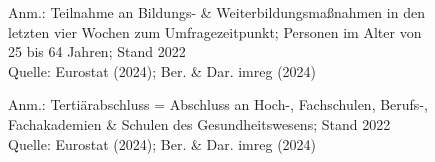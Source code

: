 \begin{figure}[p]
	{\centering {}}
	\label{map:weiterbildung}
	\begin{spacing}{1} \scriptsize
		Anm.: Teilnahme an Bildungs- \& Weiterbildungsmaßnahmen in den letzten vier Wochen zum Umfragezeitpunkt; Personen im Alter von 25 bis 64 Jahren; Stand 2022\\
		Quelle: Eurostat (2024); Ber. \& Dar. imreg (2024) \end{spacing}
\end{figure}


\begin{figure}[p]
	{\centering {}}
	\label{map:tertbildung}
	\begin{spacing}{1} \scriptsize
		Anm.: Tertiärabschluss = Abschluss an Hoch-, Fachschulen, Berufs-, Fachakademien \& Schulen des Gesundheitswesens; Stand 2022\\
		Quelle: Eurostat (2024); Ber. \& Dar. imreg (2024) \end{spacing}
\end{figure}